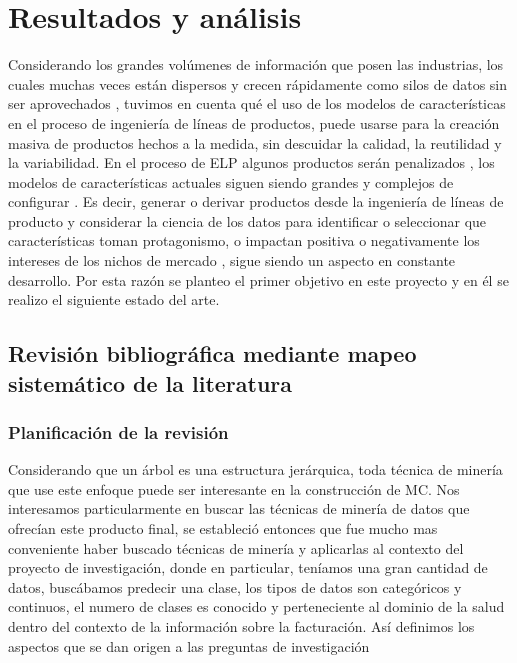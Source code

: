 \chapter{Resultados y análisis}
 
Considerando los grandes volúmenes de información que posen las industrias, los cuales muchas veces están dispersos y crecen rápidamente como silos de datos sin ser aprovechados \cite{Elovici2003}, tuvimos en cuenta  qué el uso de los modelos de características en el proceso de ingeniería de líneas de productos, puede usarse para la creación masiva de productos hechos a la medida, sin descuidar la calidad, la reutilidad y la variabilidad.
En el proceso de ELP algunos productos  serán penalizados \cite{TerBeek2015}, los modelos de características actuales siguen siendo grandes y complejos de configurar \cite{Asadi2014}. Es decir,  generar o derivar productos desde la ingeniería de líneas de producto y considerar la ciencia de los datos para identificar o seleccionar que características toman protagonismo, o impactan positiva o negativamente los intereses de los nichos de mercado \cite{Hastie2009}, sigue siendo un aspecto en constante desarrollo. Por esta razón se planteo el primer objetivo en este proyecto y en él se realizo el siguiente estado del arte.

\section{Revisión bibliográfica mediante mapeo sistemático de la literatura}

\subsection{Planificación de la revisión}
Considerando que un árbol es una estructura jerárquica, toda técnica de minería que use este enfoque puede ser interesante en la construcción de MC. Nos interesamos particularmente en buscar las técnicas de minería de datos que ofrecían este producto final, se estableció entonces que fue mucho mas conveniente haber buscado técnicas de minería y aplicarlas al contexto del proyecto de investigación, donde en particular, teníamos una gran cantidad de datos, buscábamos predecir una clase, los tipos de datos son categóricos y continuos,  el numero de clases es conocido y perteneciente al dominio de la salud dentro del contexto de la información sobre la facturación. Así definimos los aspectos que se dan origen a las preguntas de investigación


